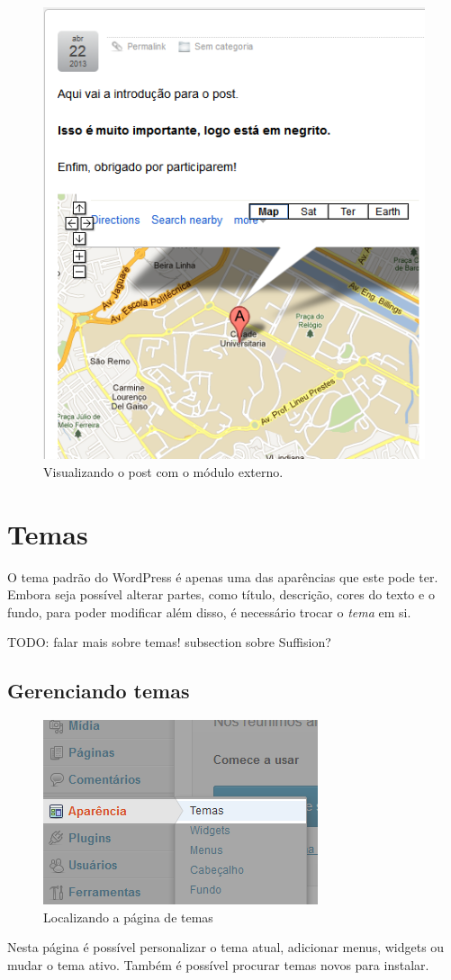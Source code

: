\documentclass[12pt,onecolumn]{article}
\begin{document}
\begin{enumerate}
\begin{figure}[H]
						\includegraphics{html5.png}
						\caption{Visualizando o post com o módulo externo.}
					\end{figure}
			\end{enumerate}

\section{Temas}
	O tema padrão do WordPress é apenas uma das aparências que este pode ter. Embora
	seja possível alterar partes, como título, descrição, cores do texto e o fundo, para poder
	modificar além disso, é necessário trocar o \textit{tema} em si.
	
	TODO: falar mais sobre temas! subsection sobre Suffision?
	
	\subsection{Gerenciando temas}
		\begin{figure}[H]
			\centering
			\includegraphics{tema1.png}
			\caption{Localizando a página de temas}
		\end{figure}
		Nesta página é possível personalizar o tema atual, adicionar menus, widgets
		ou mudar o tema ativo. Também é possível procurar temas novos para instalar.
		
\end{document}
